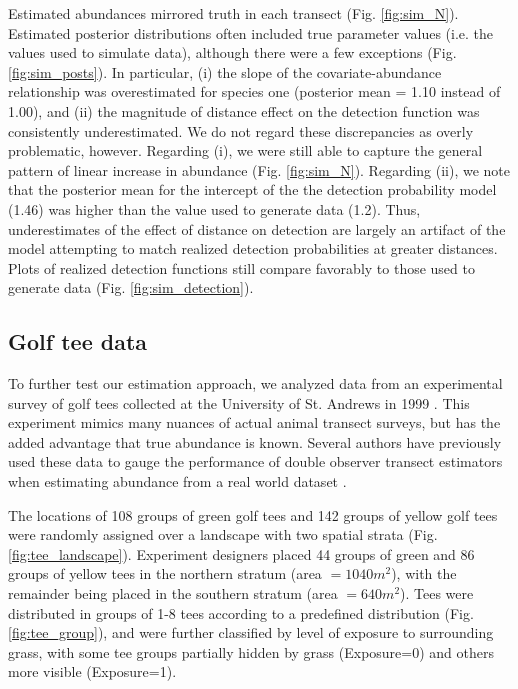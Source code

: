 \documentclass[10pt]{article}
\begin{document}
Estimated abundances mirrored truth in each transect (Fig. \ref{fig:sim_N}).  Estimated posterior distributions often included true parameter values (i.e. the values used to simulate data), although there were a few exceptions (Fig. \ref{fig:sim_posts}).  In particular, (i) the slope of the covariate-abundance relationship was overestimated for species one (posterior mean = 1.10 instead of 1.00), and (ii) the magnitude of distance effect on the detection function was consistently underestimated.  We do not regard these discrepancies as overly problematic, however. Regarding (i), we were still able to capture the general pattern of linear increase in abundance (Fig. \ref{fig:sim_N}).  Regarding (ii), we note that the posterior mean for the intercept of the the detection probability model (1.46) was higher than the value used to generate data (1.2).  Thus, underestimates of the effect of distance on detection are largely an artifact of the model attempting to match realized detection probabilities at greater distances.  Plots of realized detection functions still compare favorably to those used to generate data (Fig. \ref{fig:sim_detection}).

\subsection*{Golf tee data}

To further test our estimation approach, we analyzed data from an experimental survey of golf tees
collected at the University of St. Andrews in 1999 \cite{BorchersEtAl2002}.  This experiment mimics many nuances of actual animal transect surveys, but has the added advantage that true abundance is known.  Several authors have previously used these data to gauge the performance of double observer transect estimators when estimating abundance from a real world dataset \cite{BorchersEtAl2002,LaakeBorchers2004}.

The locations of 108 groups of green golf tees and 142 groups of yellow golf tees were randomly assigned over a landscape with two spatial strata (Fig. \ref{fig:tee_landscape}).  Experiment designers placed 44 groups of green and 86 groups of yellow tees in the northern stratum (area $=1040 m^2$), with the remainder being placed in the southern stratum (area $=640 m^2$).  Tees were distributed in groups of 1-8 tees according to a predefined distribution (Fig. \ref{fig:tee_group}), and were further classified by level of exposure to surrounding grass, with some tee groups partially hidden by grass (Exposure=0) and others more visible (Exposure=1).
\end{document}
